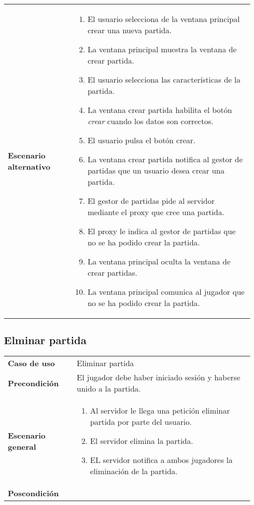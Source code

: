 {\begin{tabularx}{0.95\textwidth}{p{}|X}
\textbf{Escenario alternativo} & \begin{enumerate}
\item El usuario selecciona de la ventana principal crear una nueva partida.
\item La ventana principal muestra la ventana de crear partida.
\item El usuario selecciona las características de la partida.
\item La ventana crear partida habilita el botón \emph{crear} cuando los datos
son correctos.
\item El usuario pulsa el botón crear.
\item La ventana crear partida notifica al gestor de partidas que un usuario
desea crear una partida.
\item El gestor de partidas pide al servidor mediante el proxy que cree una
partida.
\item El proxy le indica al gestor de partidas que no se ha podido crear la
partida.
\item La ventana principal oculta la ventana de crear partidas.
\item La ventana principal comunica al jugador que no se ha podido crear la
partida.
\end{enumerate} \\

\end{tabularx}
}

\subsection{Elminar partida}
{\footnotesize
\begin{tabularx}{0.95\textwidth}{p{}|X}

\textbf{Caso de uso} & Eliminar partida \\

\textbf{Precondición} & El jugador debe haber iniciado sesión y haberse unido a
la partida.\\

\textbf{Escenario general} & \begin{enumerate}
\item Al servidor le llega una petición eliminar partida por parte del usuario.
\item El servidor elimina la partida.
\item EL servidor notifica a ambos jugadores la eliminación de la partida.

\end{enumerate} \\

\textbf{Poscondición}

\end{tabularx}
}

